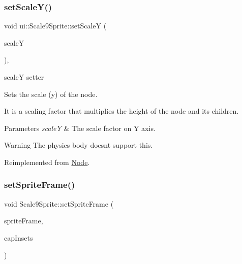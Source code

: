 \mbox{\label{classui_1_1Scale9Sprite_a7c108e20a3b0b479258447335531bfe2}} 
\subsubsection{\texorpdfstring{set\+Scale\+Y()}{setScaleY()}}
{\footnotesize\ttfamily void ui\+::\+Scale9\+Sprite\+::set\+ScaleY (\begin{DoxyParamCaption}\item[{float}]{scaleY }\end{DoxyParamCaption})\hspace{0.3cm}{\ttfamily [override]}, {\ttfamily [virtual]}}



scaleY setter 

Sets the scale (y) of the node.

It is a scaling factor that multiplies the height of the node and its children.


\begin{DoxyParams}{Parameters}
{\em scaleY} & The scale factor on Y axis.\\
\hline
\end{DoxyParams}
\begin{DoxyWarning}{Warning}
The physics body doesn\textquotesingle{}t support this. 
\end{DoxyWarning}


Reimplemented from \hyperlink{classNode_aec805a1fa9e8e1038556e468138bb804}{Node}.

\mbox{\label{classui_1_1Scale9Sprite_ad57e0c537a9a1bfae4a64b03665528d3}} 
\subsubsection{\texorpdfstring{set\+Sprite\+Frame()}{setSpriteFrame()}\hspace{0.1cm}{\footnotesize\ttfamily [1/2]}}
{\footnotesize\ttfamily void Scale9\+Sprite\+::set\+Sprite\+Frame (\begin{DoxyParamCaption}\item[{\hyperlink{classSpriteFrame}{Sprite\+Frame} $\ast$}]{sprite\+Frame,  }\item[{const \hyperlink{classRect}{Rect} \&}]{cap\+Insets }\end{DoxyParamCaption})\hspace{0.3cm}{\ttfamily [virtual]}}



